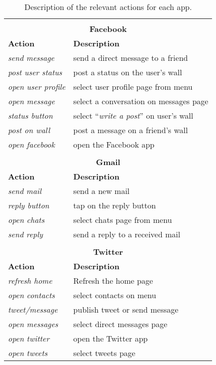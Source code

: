 \documentclass{acm_proc_article-sp}
\begin{document}
 
\begin{table}[h!] 
\begin{center} {\begin{tabular}{|l|l|}
\multicolumn{2}{c}{}  \\
  \multicolumn{2}{c}{\textbf{Facebook}}  \\
  \hline
  \textbf{Action} & \textbf{Description}\\
  \hline
  \emph{send message} & {send a direct message to a friend} \\
  \emph{post user status} &  { post a status on the user's wall}\\
  \emph{open user profile} &   {select user profile page from menu}\\
  \emph{open message} &	{select a conversation on messages page}\\
  \emph{status button} & 	{select ``\emph{write a post}'' on user's wall} \\
  \emph{post on wall} & 	{post a message on a friend's wall}  \\
  \emph{open facebook} & 	{open the Facebook app} \\
 
 \hline
 \multicolumn{2}{c}{}  \\
 \multicolumn{2}{c}{\textbf{Gmail}}  \\
 \hline
  \textbf{Action} & \textbf{Description}\\
  \hline
 \emph{send mail} &  { send a new mail} \\
\emph{reply button}    &  {tap on the reply button} \\
  \emph{open chats}    &  {select chats page from menu}\\
\emph{send reply} &   {send a reply to a received mail}\\

  \hline
  \multicolumn{2}{c}{}  \\
  \multicolumn{2}{c}{\textbf{Twitter}}  \\
  \hline
  \textbf{Action} & \textbf{Description}\\
  \hline
  \emph{refresh home}   &  { Refresh the home page}  \\
  \emph{open contacts}   &  {select contacts on menu}   \\
  \emph{tweet/message}&  { publish tweet or send message}\\ 
  \emph{open messages}  &  { select direct messages page}\\
  \emph{open twitter}    &  { open the Twitter app}\\
  \emph{open tweets}     & { select tweets page}\\

  \hline
\end{tabular} }
\end{center}
\caption{Description of the relevant actions for each app.}
\label{tab:appcations}
\end{table}
\end{document}
